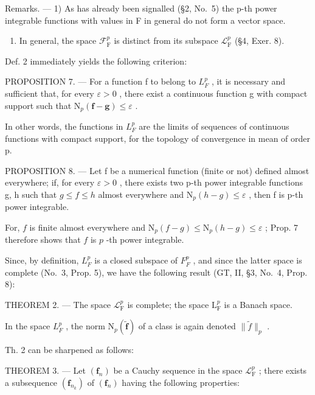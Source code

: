 Remarks. --- 1) As has already been signalled (§2, No.~5) the p-th power integrable functions with values in F in general do not form a vector space.

\begin{enumerate}
\def\labelenumi{\arabic{enumi})}
\setcounter{enumi}{1}
\tightlist
\item
  In general, the space \(\mathcal{F}_{\mathrm{F}}^{p}\) is distinct from its subspace \(\mathcal{L}_{\mathrm{F}}^{p}\) (§4, Exer. 8).
\end{enumerate}

Def. 2 immediately yields the following criterion:

PROPOSITION 7. --- For a function f to belong to \(L_{F}^{p}\) , it is necessary and sufficient that, for every \(\varepsilon > 0\) , there exist a continuous function g with compact support such that \(\mathrm{N}_{p}(\mathbf{f} - \mathbf{g}) \leqslant \varepsilon\) .

In other words, the functions in \(L_{F}^{p}\) are the limits of sequences of continuous functions with compact support, for the topology of convergence in mean of order p.

PROPOSITION 8. --- Let f be a numerical function (finite or not) defined almost everywhere; if, for every \(\varepsilon > 0\) , there exists two p-th power integrable functions g, h such that \(g \leqslant f \leqslant h\) almost everywhere and \(\mathrm{N}_{p}(h - g) \leqslant \varepsilon\) , then f is p-th power integrable.

For, \(f\) is finite almost everywhere and \(\mathrm{N}_p(f - g) \leqslant \mathrm{N}_p(h - g) \leqslant \varepsilon\) ; Prop. 7 therefore shows that \(f\) is \(p\) -th power integrable.

Since, by definition, \(L_{F}^{p}\) is a closed subspace of \(F_{F}^{p}\) , and since the latter space is complete (No.~3, Prop. 5), we have the following result (GT, II, §3, No.~4, Prop. 8):

THEOREM 2. --- The space \(\mathcal{L}_{\mathrm{F}}^{p}\) is complete; the space \(\mathrm{L}_{\mathrm{F}}^{p}\) is a Banach space.

In the space \(L_{F}^{p}\) , the norm \(\mathrm{N}_{p}(\widetilde{\mathbf{f}})\) of a class is again denoted \(\| \widetilde{f} \|_{p}\) .

Th. 2 can be sharpened as follows:

THEOREM 3. --- Let \((\mathbf{f}_n)\) be a Cauchy sequence in the space \(\mathcal{L}_{\mathrm{F}}^p\) ; there exists a subsequence \((\mathbf{f}_{n_k})\) of \((\mathbf{f}_n)\) having the following properties:

